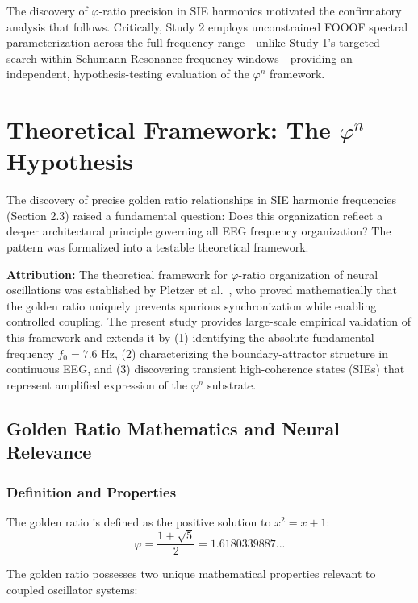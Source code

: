 \documentclass[11pt,a4paper]{article}
\newcommand{\phisym}{\varphi}
\begin{document}
The discovery of $\phisym$-ratio precision in SIE harmonics motivated the confirmatory analysis that follows. Critically, Study 2 employs unconstrained FOOOF spectral parameterization across the full frequency range---unlike Study 1's targeted search within Schumann Resonance frequency windows---providing an independent, hypothesis-testing evaluation of the $\phisym^n$ framework.

\section{Theoretical Framework: The $\phisym^n$ Hypothesis}

The discovery of precise golden ratio relationships in SIE harmonic frequencies (Section 2.3) raised a fundamental question: Does this organization reflect a deeper architectural principle governing all EEG frequency organization? The pattern was formalized into a testable theoretical framework.

\begin{criticalpoint}
\textbf{Attribution:} The theoretical framework for $\phisym$-ratio organization of neural oscillations was established by Pletzer et al.\ \parencite{pletzer2010golden}, who proved mathematically that the golden ratio uniquely prevents spurious synchronization while enabling controlled coupling. The present study provides large-scale empirical validation of this framework and extends it by (1) identifying the absolute fundamental frequency $f_0 = 7.6$ Hz, (2) characterizing the boundary-attractor structure in continuous EEG, and (3) discovering transient high-coherence states (SIEs) that represent amplified expression of the $\phisym^n$ substrate.
\end{criticalpoint}

\subsection{Golden Ratio Mathematics and Neural Relevance}

\subsubsection{Definition and Properties}
The golden ratio is defined as the positive solution to $x^2 = x + 1$:
\begin{equation}
\phisym = \frac{1 + \sqrt{5}}{2} = 1.6180339887...
\end{equation}

The golden ratio possesses two unique mathematical properties relevant to coupled oscillator systems:
\end{document}
